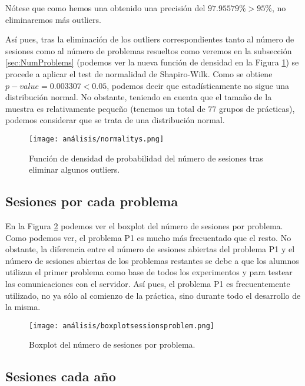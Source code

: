 Nótese que como hemos una obtenido una precisión del $97.95579\% > 95\%$, no eliminaremos más outliers.

Así pues, tras la eliminación de los outliers correspondientes tanto al número de sesiones como al número de problemas resueltos como veremos en la subsección \ref{sec:NumProblems} (podemos ver la nueva función de densidad en la Figura \ref{fig:normalitys}) se procede a aplicar el test de normalidad de Shapiro-Wilk. Como se obtiene $p-value = 0.003307 < 0.05$, podemos decir que estadísticamente no sigue una distribución normal. No obstante, teniendo en cuenta que el tamaño de la muestra es relativamente pequeño (tenemos un total de $77$ grupos de prácticas), podemos considerar que se trata de una distribución normal.

\begin{figure}[H]
    \centering
    \texttt{[image: análisis/normalitys.png]}
    \caption{Función de densidad de probabilidad del número de sesiones tras eliminar algunos outliers.}
    \label{fig:normalitys}
\end{figure}

\subsection{Sesiones por cada problema}

En la Figura \ref{fig:boxplotsessionsproblem} podemos ver el boxplot del número de sesiones por problema. Como podemos ver, el problema P1 es mucho más frecuentado que el resto. No obstante, la diferencia entre el número de sesiones abiertas del problema P1 y el número de sesiones abiertas de los problemas restantes se debe a que los alumnos utilizan el primer problema como base de todos los experimentos y para testear las comunicaciones con el servidor. Así pues, el problema P1 es frecuentemente utilizado, no ya sólo al comienzo de la práctica, sino durante todo el desarrollo de la misma.

\begin{figure}[H]
    \centering
    \texttt{[image: análisis/boxplotsessionsproblem.png]}
    \caption{Boxplot del número de sesiones por problema.}
    \label{fig:boxplotsessionsproblem}
\end{figure}

\subsection{Sesiones cada año}\label{sec:ANOVANumSessions}

